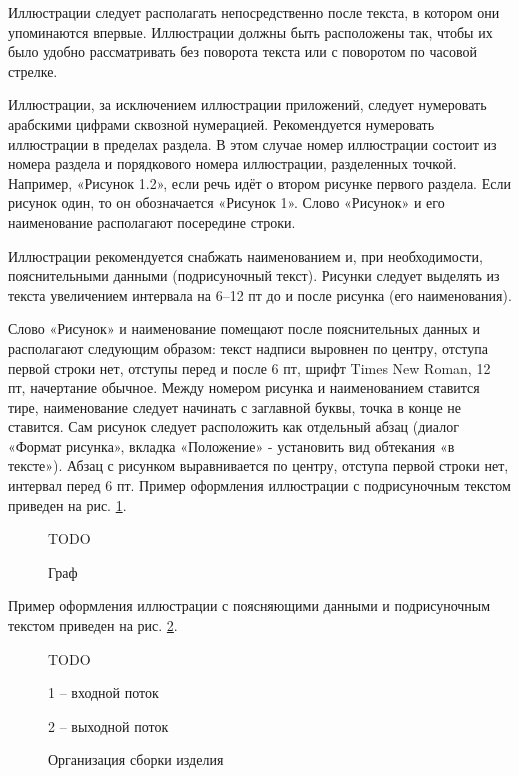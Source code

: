 Иллюстрации следует располагать непосредственно после текста, в котором они
упоминаются впервые. Иллюстрации должны быть расположены так, чтобы их было удобно
рассматривать без поворота текста или с поворотом по часовой стрелке.

Иллюстрации, за исключением иллюстрации приложений, следует нумеровать арабскими цифрами 
сквозной нумерацией. Рекомендуется нумеровать иллюстрации в пределах раздела. В этом случае
номер иллюстрации состоит из номера раздела и порядкового номера
иллюстрации, разделенных точкой. Например, «Рисунок 1.2», если речь идёт о втором рисунке
первого раздела. Если рисунок один, то он обозначается «Рисунок 1». Слово «Рисунок» и его
наименование располагают посередине строки.

Иллюстрации рекомендуется снабжать наименованием и, при необходимости,
пояснительными данными (подрисуночный текст). Рисунки следует выделять из текста
увеличением интервала на 6–12 пт до и после рисунка (его наименования).

Слово «Рисунок» и наименование помещают после пояснительных данных и
располагают следующим образом: текст надписи выровнен по центру, отступа первой строки
нет, отступы перед и после 6 пт, шрифт Times New Roman, 12 пт, начертание обычное. Между
номером рисунка и наименованием ставится тире, наименование следует начинать с заглавной
буквы, точка в конце не ставится. Сам рисунок следует расположить как отдельный абзац
(диалог «Формат рисунка», вкладка «Положение» - установить вид обтекания «в тексте»). Абзац
с рисунком выравнивается по центру, отступа первой строки нет, интервал перед 6 пт.
Пример оформления иллюстрации с подрисуночным текстом приведен на рис. \ref{figsample}.

\begin{figure}[h]
	\begin{mdframed}
		\centerline{TODO}
	\end{mdframed}
	\caption{Граф}
	\label{figsample}
\end{figure}

Пример оформления иллюстрации с поясняющими данными и подрисуночным текстом
приведен на рис. \ref{figsample2}.

\begin{figure}[h]
	\begin{mdframed}
		\centerline{TODO}
	\end{mdframed}
	\centerline{1 -- входной поток}
	\centerline{2 -- выходной поток}
	\caption{Организация сборки изделия}
	\label{figsample2}
\end{figure}

